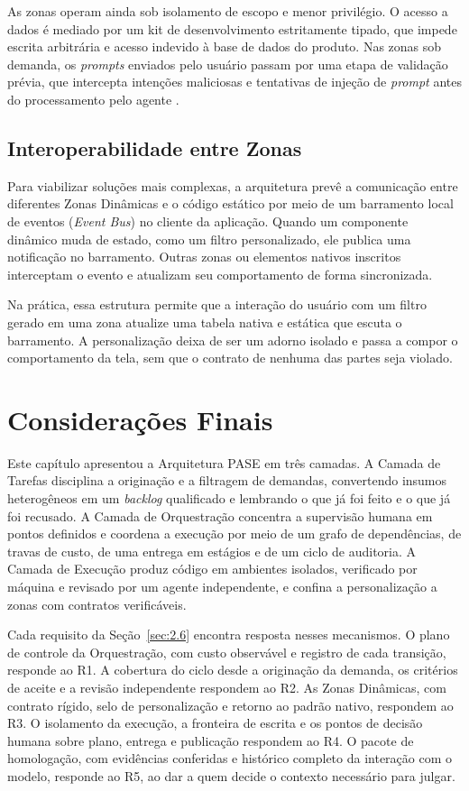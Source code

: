 As zonas operam ainda sob isolamento de escopo e menor privilégio. O acesso a dados é mediado por um kit de desenvolvimento estritamente tipado, que impede escrita arbitrária e acesso indevido à base de dados do produto. Nas zonas sob demanda, os \textit{prompts} enviados pelo usuário passam por uma etapa de validação prévia, que intercepta intenções maliciosas e tentativas de injeção de \textit{prompt} antes do processamento pelo agente \cite{chhabra2026security}.

\subsection{Interoperabilidade entre Zonas}\label{sec:4.5.6}

Para viabilizar soluções mais complexas, a arquitetura prevê a comunicação entre diferentes Zonas Dinâmicas e o código estático por meio de um barramento local de eventos (\textit{Event Bus}) no cliente da aplicação. Quando um componente dinâmico muda de estado, como um filtro personalizado, ele publica uma notificação no barramento. Outras zonas ou elementos nativos inscritos interceptam o evento e atualizam seu comportamento de forma sincronizada.

Na prática, essa estrutura permite que a interação do usuário com um filtro gerado em uma zona atualize uma tabela nativa e estática que escuta o barramento. A personalização deixa de ser um adorno isolado e passa a compor o comportamento da tela, sem que o contrato de nenhuma das partes seja violado.

\section{Considerações Finais}\label{sec:4.6}

Este capítulo apresentou a Arquitetura PASE em três camadas. A Camada de Tarefas disciplina a originação e a filtragem de demandas, convertendo insumos heterogêneos em um \textit{backlog} qualificado e lembrando o que já foi feito e o que já foi recusado. A Camada de Orquestração concentra a supervisão humana em pontos definidos e coordena a execução por meio de um grafo de dependências, de travas de custo, de uma entrega em estágios e de um ciclo de auditoria. A Camada de Execução produz código em ambientes isolados, verificado por máquina e revisado por um agente independente, e confina a personalização a zonas com contratos verificáveis.

Cada requisito da Seção~\ref{sec:2.6} encontra resposta nesses mecanismos. O plano de controle da Orquestração, com custo observável e registro de cada transição, responde ao R1. A cobertura do ciclo desde a originação da demanda, os critérios de aceite e a revisão independente respondem ao R2. As Zonas Dinâmicas, com contrato rígido, selo de personalização e retorno ao padrão nativo, respondem ao R3. O isolamento da execução, a fronteira de escrita e os pontos de decisão humana sobre plano, entrega e publicação respondem ao R4. O pacote de homologação, com evidências conferidas e histórico completo da interação com o modelo, responde ao R5, ao dar a quem decide o contexto necessário para julgar.

